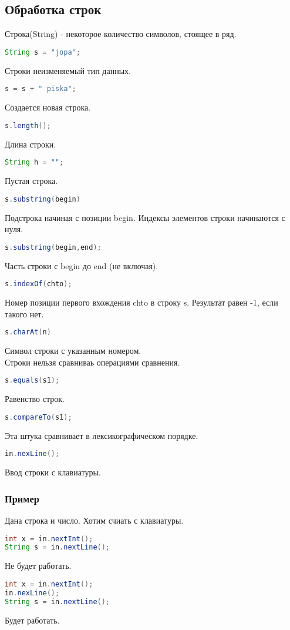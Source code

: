\documentclass{article}
\begin{document}
\subsection{Обработка строк}
Строка(String) - некоторое количество символов, стоящее в ряд.
\begin{lstlisting}[language=Java] 
String s = "jopa";
\end{lstlisting} 
Строки неизменяемый тип данных.
\begin{lstlisting}[language=Java] 
s = s + " piska";
\end{lstlisting} 
Создается новая строка.
\begin{lstlisting}[language=Java] 
s.length();
\end{lstlisting} 
Длина строки.
\begin{lstlisting}[language=Java] 
String h = "";
\end{lstlisting} 
Пустая строка.
\begin{lstlisting}[language=Java] 
s.substring(begin) 
\end{lstlisting} 
Подстрока начиная с позиции begin. Индексы элементов строки начинаются с нуля.
\begin{lstlisting}[language=Java] 
s.substring(begin,end);
\end{lstlisting} 
Часть строки с begin до end (не включая).
\begin{lstlisting}[language=Java] 
s.indexOf(chto);
\end{lstlisting} 
Номер позиции первого вхождения chto в строку s. Результат равен -1, если такого нет.
\begin{lstlisting}[language=Java] 
s.charAt(n) 
\end{lstlisting} 
Символ строки с указанным номером.\\
Строки нельзя сравниваь операциями сравнения.
\begin{lstlisting}[language=Java] 
s.equals(s1);
\end{lstlisting} 
Равенство строк.
\begin{lstlisting}[language=Java] 
s.compareTo(s1);
\end{lstlisting} 
Эта штука сравнивает в лексикографическом порядке.
\begin{lstlisting}[language=Java] 
in.nexLine();
\end{lstlisting} 
Ввод строки с клавиатуры.
\subsubsection{Пример}
Дана строка и число. Хотим счиать с клавиатуры.
\begin{lstlisting}[language=Java] 
int x = in.nextInt();
String s = in.nextLine();
\end{lstlisting} 
Не будет работать.
\begin{lstlisting}[language=Java] 
int x = in.nextInt();
in.nexLine();
String s = in.nextLine();
\end{lstlisting} 
Будет работать.
\end{document}
